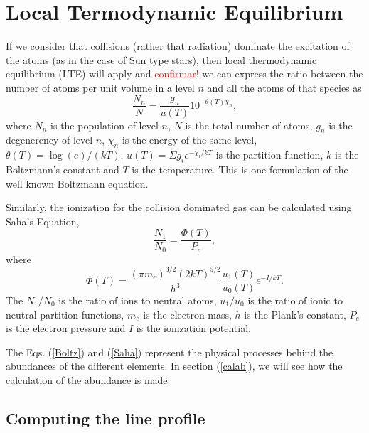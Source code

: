 \documentclass[dvips,12pt,a4paper]{report}
\begin{document}
{\section {Local Termodynamic Equilibrium}
\label{LTE}
If we consider that collisions (rather that radiation) dominate the excitation of the atoms (as in the case of Sun type stars), then local thermodynamic equilibrium (LTE) will apply and  \textcolor{red}{confirmar!} we can express the ratio between the number of atoms per unit volume in a level $n$ and all the atoms of that species as
\begin{equation}
\label{Boltz}
 \frac{N_n}{N}=\frac{g_n}{u(T)}10^{-\theta(T)\chi_n},
\end{equation}
where $N_n$ is the population of level $n$, $N$ is the total number of atoms, $g_n$ is the degenerency of level $n$, $\chi_n$ is the energy of the same level, $\theta(T)=\log(e)/(kT)$, $u(T)=\Sigma g_ie^{-\chi_i/kT}$ is the partition function, $k$ is the Boltzmann's constant and $T$ is the temperature. This is one formulation of the well known Boltzmann equation. %

Similarly, the ionization for the collision dominated gas can be calculated using Saha's Equation,
\begin{equation}
\label{Saha}
\frac{N_1}{N_0}=\frac{\Phi(T)}{P_e},
\end{equation}
where 
\begin {equation}
\Phi(T)=\frac{(\pi m_e)^{3/2}(2kT)^{5/2}}{h^3}\frac{u_1(T)}{u_0(T)}e^{-I/kT}.
\end {equation}
The $N_1/N_0$ is the ratio of ions to neutral atoms, $u_1/u_0$ is the ratio of ionic to neutral partition functions, $m_e$ is the electron mass, $h$ is the Plank's constant, $P_e$ is the electron pressure and $I$ is the ionization potential.

The Eqs. (\ref{Boltz}) and (\ref{Saha}) represent the physical processes behind the abundances of the different elements. In section (\ref{calab}), we will see how the calculation of the abundance is made.

\subsection {Computing the line profile}

}
\end{document}

